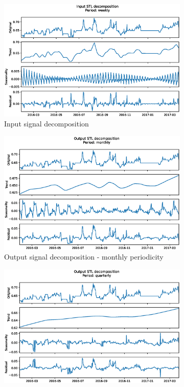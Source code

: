 \documentclass{scrartcl}
\begin{document}
  \begin{figure}[ht]
    \centering
    \begin{subfigure}[b]{0.65\textwidth}
      \centering
      \includegraphics[width=\textwidth]{./figures/weekly_decomp.eps}
      \caption{Input signal decomposition}
      \label{fig:weekly_decomp}
    \end{subfigure}
    \hfill
    \begin{subfigure}[b]{0.65\textwidth}
      \centering
      \includegraphics[width=\textwidth]{./figures/monthly_decomp.eps}
      \caption{Output signal decomposition - monthly periodicity}
      \label{fig:monthly_decomp}
    \end{subfigure}
    \hfill
    \begin{subfigure}[b]{0.65\textwidth}
      \centering
      \includegraphics[width=\textwidth]{./figures/quarterly_decomp.eps}

\end{subfigure}
\end{figure}
\end{document}
